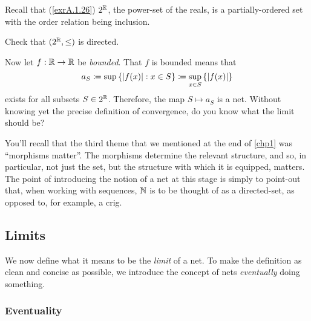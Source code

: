 \begin{exm}
Recall that (\cref{exrA.1.26}) $2^{\mathbb{R}}$, the power-set of the reals, is a partially-ordered set with the order relation being inclusion.
\begin{exr}
Check that $(2^{\mathbb{R}},\leq )$ is directed.
\end{exr}
Now let $f:\mathbb{R} \rightarrow \mathbb{R}$ be \emph{bounded}.  That $f$ is bounded means that
\begin{equation}
a_S\coloneqq \sup \left\{ \lvert f(x)\rvert:x\in S\right\} \coloneqq \sup _{x\in S}\left\{ \lvert f(x)\rvert\right\}
\end{equation}
exists for all subsets $S\in 2^{\mathbb{R}}$.  Therefore, the map $S\mapsto a_S$ is a net.  Without knowing yet the precise definition of convergence, do you know what the limit should be?
\end{exm}

You'll recall that the third theme that we mentioned at the end of \cref{chp1}  was ``morphisms matter''.  The morphisms determine the relevant structure, and so, in particular, not just the set, but the structure with which it is equipped, matters.  The point of introducing the notion of a net at this stage is simply to point-out that, when working with sequences, $\mathbb{N}$ is to be thought of as a directed-set, as opposed to, for example, a crig.

\subsection{Limits}

We now define what it means to be the \emph{limit} of a net.  To make the definition as clean and concise as possible, we introduce the concept of nets \emph{eventually} doing something.

\subsubsection{Eventuality}


